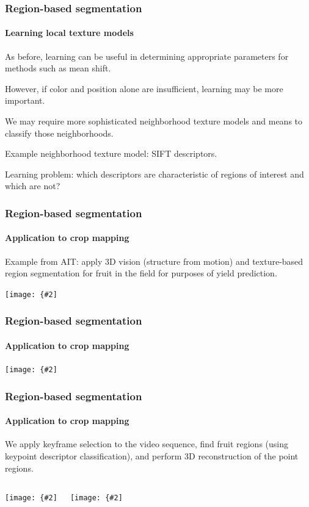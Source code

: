 \documentclass[aspectratio=169]{beamer}
\newcommand{\myfig}[3]{\centerline{\texttt{[image: \{\#2]}}}
\begin{document}
\begin{frame}
\frametitle{Region-based segmentation}
\framesubtitle{Learning local texture models}

As before, learning can be useful in determining appropriate parameters
for methods such as mean shift.

\medskip

However, if color and position alone are insufficient, learning may be
more important.

\medskip

We may require more sophisticated neighborhood \alert{texture} models
and means to \alert{classify} those neighborhoods.

\medskip

Example neighborhood texture model: SIFT descriptors.

\medskip

Learning problem: which descriptors are characteristic of regions of
interest and which are not?

\end{frame}


\begin{frame}
\frametitle{Region-based segmentation}
\framesubtitle{Application to crop mapping}

Example from AIT: apply 3D vision (structure from motion) and
texture-based region segmentation for fruit in the field for purposes
of yield prediction.

\medskip

\myfig{4in}{figs/sequence}{Image sequence extracted
  from video file taken from agricultural field}

\end{frame}


\begin{frame}
\frametitle{Region-based segmentation}
\framesubtitle{Application to crop mapping}

\myfig{3.5in}{figs/SmartPhonePlatform}{}

\end{frame}


\begin{frame}
\frametitle{Region-based segmentation}
\framesubtitle{Application to crop mapping}

We apply keyframe selection to the video sequence, find fruit regions
(using keypoint descriptor classification), and perform 3D
reconstruction of the point regions.

\begin{columns}

  \column{1.5in}
  \myfig{1.3in}{figs/manual_ss5}{}

  \column{1.5in}
  \myfig{1.3in}{figs/manual_ss4}{}

\end{columns}

\end{frame}
\end{document}

